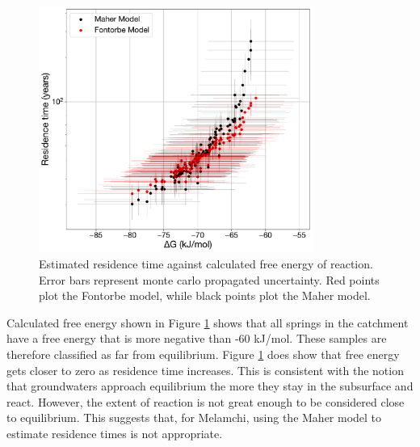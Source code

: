 \begin{figure}[H]
    \centering
    \includegraphics[width=0.8\textwidth]{DGMF.pdf}
    \caption{Estimated residence time against calculated free energy of reaction. Error bars represent monte carlo propagated uncertainty. Red points plot the Fontorbe model, while black points plot the Maher model.}
    \label{fig:deltag}
\end{figure}

\FloatBarrier

Calculated free energy shown in Figure \ref{fig:deltag} shows that all springs in the catchment have a free energy that is more negative than -60 kJ/mol. These samples are therefore classified as far from equilibrium. Figure \ref{fig:deltag} does show that free energy gets closer to zero as residence time increases. This is consistent with the notion that groundwaters approach equilibrium the more they stay in the subsurface and react. However, the extent of reaction is not great enough to be considered close to equilibrium. This suggests that, for Melamchi, using the Maher model to estimate residence times is not appropriate.





